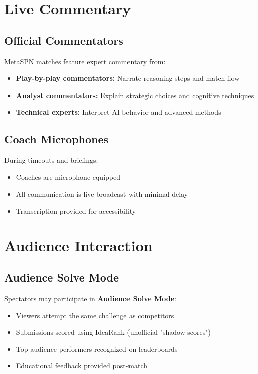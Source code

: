 \section{Live Commentary}

\subsection{Official Commentators}

MetaSPN matches feature expert commentary from:
\begin{itemize}[leftmargin=*]
  \item \textbf{Play-by-play commentators:} Narrate reasoning steps and match flow
  \item \textbf{Analyst commentators:} Explain strategic choices and cognitive techniques
  \item \textbf{Technical experts:} Interpret AI behavior and advanced methods
\end{itemize}

\subsection{Coach Microphones}

During timeouts and briefings:
\begin{itemize}[leftmargin=*]
  \item Coaches are microphone-equipped
  \item All communication is live-broadcast with minimal delay
  \item Transcription provided for accessibility
\end{itemize}

\section{Audience Interaction}

\subsection{Audience Solve Mode}

Spectators may participate in \textbf{Audience Solve Mode}:

\begin{itemize}[leftmargin=*]
  \item Viewers attempt the same challenge as competitors
  \item Submissions scored using IdeaRank (unofficial "shadow scores")
  \item Top audience performers recognized on leaderboards
  \item Educational feedback provided post-match
\end{itemize}

